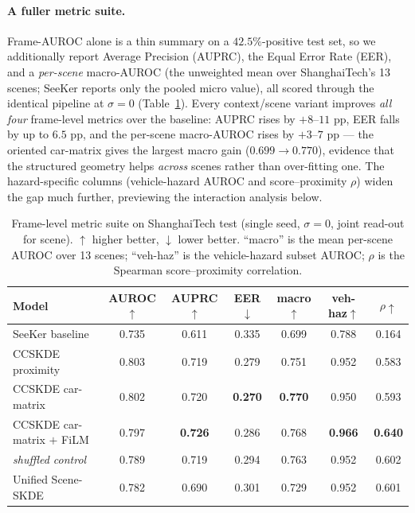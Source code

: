 \documentclass{article}
\begin{document}
\paragraph{A fuller metric suite.} Frame-AUROC alone is a thin summary on a
$42.5\%$-positive test set, so we additionally report Average Precision (AUPRC),
the Equal Error Rate (EER), and a \emph{per-scene} macro-AUROC (the unweighted
mean over ShanghaiTech's 13 scenes; SeeKer reports only the pooled micro value),
all scored through the identical pipeline at $\sigma{=}0$ (Table~\ref{tab:suite}).
Every context/scene variant improves \emph{all four} frame-level metrics over the
baseline: AUPRC rises by $+8$--$11$ pp, EER falls by up to $6.5$ pp, and the
per-scene macro-AUROC rises by $+3$--$7$ pp --- the oriented car-matrix gives the
largest macro gain ($0.699\!\rightarrow\!0.770$), evidence that the structured
geometry helps \emph{across} scenes rather than over-fitting one. The
hazard-specific columns (vehicle-hazard AUROC and score--proximity $\rho$) widen
the gap much further, previewing the interaction analysis below.

\begin{table}[t]
\centering
\caption{Frame-level metric suite on ShanghaiTech test (single seed, $\sigma{=}0$,
joint read-out for scene). $\uparrow$ higher better, $\downarrow$ lower better.
``macro'' is the mean per-scene AUROC over 13 scenes; ``veh-haz'' is the
vehicle-hazard subset AUROC; $\rho$ is the Spearman score--proximity correlation.}
\label{tab:suite}
\begin{tabular}{lcccccc}
\toprule
Model & AUROC$\uparrow$ & AUPRC$\uparrow$ & EER$\downarrow$ & macro$\uparrow$ & veh-haz$\uparrow$ & $\rho\uparrow$ \\
\midrule
SeeKer baseline            & 0.735 & 0.611 & 0.335 & 0.699 & 0.788 & 0.164 \\
CCSKDE proximity           & 0.803 & 0.719 & 0.279 & 0.751 & 0.952 & 0.583 \\
CCSKDE car-matrix          & 0.802 & 0.720 & \textbf{0.270} & \textbf{0.770} & 0.950 & 0.593 \\
CCSKDE car-matrix $+$ FiLM & 0.797 & \textbf{0.726} & 0.286 & 0.768 & \textbf{0.966} & \textbf{0.640} \\
\;\;\emph{shuffled control}& 0.789 & 0.719 & 0.294 & 0.763 & 0.952 & 0.602 \\
Unified Scene-SKDE         & 0.782 & 0.690 & 0.301 & 0.729 & 0.952 & 0.601 \\
\bottomrule
\end{tabular}
\end{table}
\end{document}
